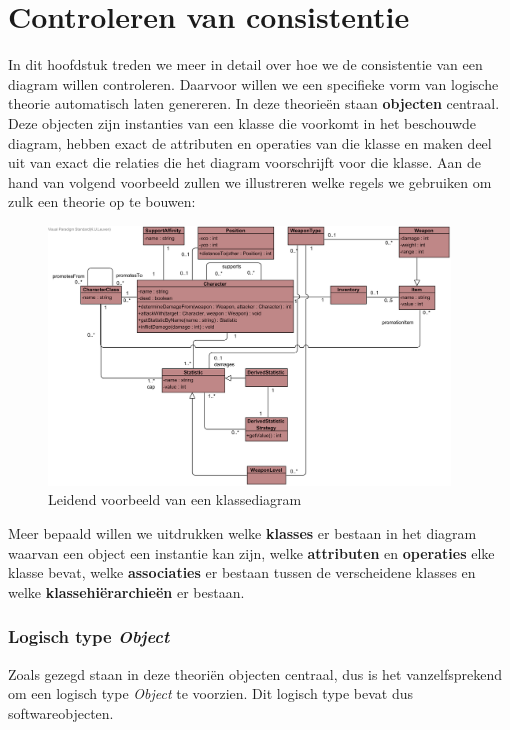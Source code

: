 \chapter{Controleren van consistentie}\label{sec:consistentie}
In dit hoofdstuk treden we meer in detail over hoe we de consistentie van een diagram willen controleren. Daarvoor willen we een specifieke vorm van logische theorie automatisch laten genereren. In deze theorie\"en staan \textbf{objecten} centraal. Deze objecten zijn instanties van een klasse die voorkomt in het beschouwde diagram, hebben exact de attributen en operaties van die klasse en maken deel uit van exact die relaties die het diagram voorschrijft voor die klasse. Aan de hand van volgend voorbeeld zullen we illustreren welke regels we gebruiken om zulk een theorie op te bouwen:

\begin{figure}[H]
	\includegraphics[width=0.95\textwidth]{chap-consistentie/diagram-voorbeeld.png}
	\caption{Leidend voorbeeld van een klassediagram}
	\label{fig:diagram-voorbeeld}
\end{figure}

Meer bepaald willen we uitdrukken welke \textbf{klasses} er bestaan in het diagram waarvan een object een instantie kan zijn, welke \textbf{attributen} en \textbf{operaties} elke klasse bevat, welke \textbf{associaties} er bestaan tussen de verscheidene klasses en welke \textbf{klassehi\"erarchie\"en} er bestaan.

\subsection{Logisch type \textit{Object}}
Zoals gezegd staan in deze theori\"en objecten centraal, dus is het vanzelfsprekend om een logisch type \textit{Object} te voorzien. Dit logisch type bevat dus softwareobjecten.


